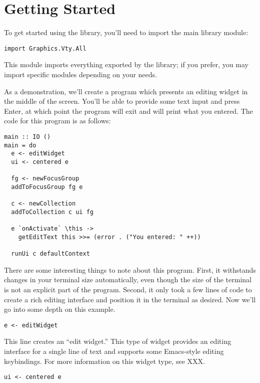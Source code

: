 \section{Getting Started}
\label{sec:gettingStarted}

To get started using the library, you'll need to import the main library
module:

\begin{verbatim}
import Graphics.Vty.All
\end{verbatim}

This module imports everything exported by the library; if you prefer,
you may import specific modules depending on your needs.

As a demonstration, we'll create a program which presents an editing
widget in the middle of the screen.  You'll be able to provide some
text input and press Enter, at which point the program will exit and
will print what you entered.  The code for this program is as follows:

\begin{verbatim}
main :: IO ()
main = do
  e <- editWidget
  ui <- centered e

  fg <- newFocusGroup
  addToFocusGroup fg e

  c <- newCollection
  addToCollection c ui fg

  e `onActivate` \this ->
    getEditText this >>= (error . ("You entered: " ++))

  runUi c defaultContext
\end{verbatim}

There are some interesting things to note about this program.  First,
it withstands changes in your terminal size automatically, even though
the size of the terminal is not an explicit part of the program.
Second, it only took a few lines of code to create a rich editing
interface and position it in the terminal as desired.  Now we'll go
into some depth on this example.

\begin{verbatim}
e <- editWidget
\end{verbatim}

This line creates an “edit widget.”  This type of widget provides an
editing interface for a single line of text and supports some
Emacs-style editing keybindings.  For more information on this widget
type, see XXX.

\begin{verbatim}
ui <- centered e
\end{verbatim}

